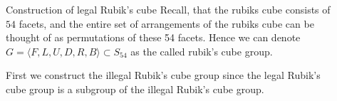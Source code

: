 \documentclass[final]{beamer}
\newlength{\sepwidth}
\newlength{\colwidth}
\newcommand{\separatorcolumn}{\begin{column}{\sepwidth}\end{column}}
\begin{document}
\begin{frame}[t]
\begin{columns}[t]
\begin{column}{\colwidth}



\end{column}

\separatorcolumn

\begin{column}{\colwidth}

  \begin{exampleblock}{Construction of legal Rubik's cube}
    Recall, that the rubiks cube consists of $54$ facets, and the entire set of arrangements of the rubiks cube can be thought of as permutations of these 54 facets. Hence we can denote $G = \langle F,L,U,D,R,B\rangle \subset S_{54}$ as the called rubik's cube group.


    First we construct the illegal Rubik's cube group since the legal Rubik's cube group is a subgroup of the illegal Rubik's cube group.
    

\end{exampleblock}
\end{column}
\end{columns}
\end{frame}
\end{document}
